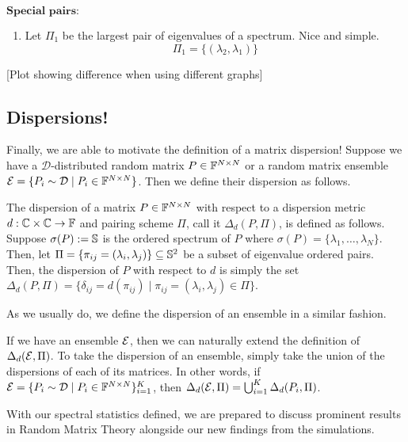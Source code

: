 $\textbf{Special pairs:}$
\begin{enumerate}
  \item Let $\Pi_1$ be the largest pair of eigenvalues of a spectrum. Nice and simple.
  $$\Pi_1 = \{(\lambda_2,\lambda_1)\}$$
\end{enumerate}
[Plot showing difference when using different graphs]


\subsection{Dispersions!}


Finally, we are able to motivate the definition of a matrix dispersion! Suppose we have a $\mathcal{D}$-distributed random matrix $P \in \F^{N \times N}$ or a random matrix ensemble $\Ens = \{P_i \sim \mathcal{D} \mid P_i \in \F^{N \times N}\}$. Then we define their dispersion as follows. 

\begin{definition}[Dispersion]
The dispersion of a matrix $P \in \F^{N \times N}$ with respect to a dispersion metric $d: \Cc \times \Cc \to \F$ and pairing scheme $\Pi$, call it $\Delta_d(P, \Pi)$, is defined as follows. Suppose $\sigma(P) := \S$ is the ordered spectrum of $P$ where $\sigma(P) = \{\lambda_1, \dots, \lambda_N\}$. Then, let $\Pi = \{\pi_{ij} = (\lambda_i,\lambda_j) \} \subseteq \S^2$ be a subset of eigenvalue ordered pairs. Then, the dispersion of $P$ with respect to $d$ is simply the set $\Delta_d(P, \Pi)=\{\delta_{ij} = d(\pi_{ij}) \mid \pi_{ij} = (\lambda_i,\lambda_j) \in \Pi\}$.
\end{definition}

As we usually do, we define the dispersion of an ensemble in a similar fashion. 

\begin{definition}
If we have an ensemble $\Ens$, then we can naturally extend the definition of $\Delta_d(\Ens, \Pi)$. To take the dispersion of an ensemble, simply take the union of the dispersions of each of its matrices. In other words, if $\Ens = \{P_i \sim \mathcal{D} \mid P_i \in \F^{N \times N}\}_{i = 1}^K$, then $\Delta_d(\Ens, \Pi) = \bigcup_{i=1}^K \Delta_d(P_i, \Pi)$.
\end{definition}

With our spectral statistics defined, we are prepared to discuss prominent results in Random Matrix Theory alongside our new findings from the simulations. 

